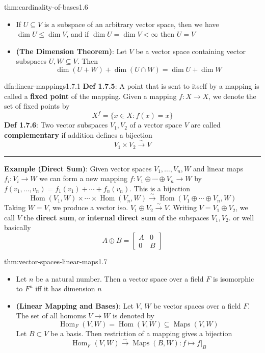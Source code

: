 \documentclass[landscape, 8pt]{extarticle}
\DeclareMathOperator{\Maps}{Maps}
\DeclareMathOperator{\Hom}{Hom}
\begin{document}
\begin{multicols}{3}
\begin{thm}{thm:cardinality-of-bases}{1.6}
\begin{itemize}
        \item[\textbf{1.6.9}] If $U \subseteq V$ is a subspace of an arbitrary vector space, then we have $\dim U \le \dim V$, and if $\dim U = \dim V < \infty$ then $U = V$
        \item[\textbf{1.6.10}] \textbf{(The Dimension Theorem)}: Let $V$ be a vector space containing vector subspaces $U,W\subseteq V$. Then
        \[\dim(U + W) + \dim(U \cap W) = \dim U + \dim W\]
    \end{itemize}
\end{thm}

\begin{dfn}{dfn:linear-mappings}{1.7.1}
    \textbf{Def 1.7.5}: A point that is sent to itself by a mapping is called a \textbf{fixed point} of the mapping. Given a mapping $f : X \to X$, we denote the set of fixed points by
    \[X^{f} = \{x \in X : f(x) = x\}\]
    \textbf{Def 1.7.6}: Two vector subspaces $V_{1}, V_{2}$ of a vector space $V$ are called \textbf{complementary} if addition defines a bijection
    \[V_{1} \times V_{2} \xrightarrow{\sim} V\]

    \vspace{-5pt}
    \noindent\rule{\textwidth}{0.2pt}

    \textbf{Example (Direct Sum)}: Given vector spaces $V_{1},\dots,V_{n}, W$ and linear maps $f_{i} : V_{i} \to W$ we can form a new mapping $f : V_{1} \oplus \cdots \oplus V_{n} \to W$ by $f(v_{1},\dots,v_{n}) = f_{1}(v_{1}) + \cdots + f_{n}(v_{n})$. This is a bijection
    \[\Hom(V_{1}, W) \times \cdots \times \Hom(V_{n}, W) \xrightarrow{\sim} \Hom(V_{1} \oplus \cdots \oplus V_{n}, W)\]
    Taking $W = V$, we produce a vector iso. $V_{1} \oplus V_{2} \xrightarrow{\sim} V$. Writing $V = V_{1} \oplus V_{2}$, we call $V$ the \textbf{direct sum}, or \textbf{internal direct sum} of the subspaces $V_{1}, V_{2}$. or well basically
    \[A \oplus B = \begin{bmatrix}
        A & 0 \\
        0 & B
    \end{bmatrix}\]

\end{dfn}

\begin{thm}{thm:vector-spaces-linear-maps}{1.7}
    \begin{itemize}
        \setlength\itemsep{0em}
        \item[\textbf{1.7.7}] Let $n$ be a natural number. Then a vector space over a field $F$ is isomorphic to $F^{n}$ iff it has dimension $n$
        \item[\textbf{1.7.8}] \textbf{(Linear Mapping and Bases)}: Let $V$, $W$ be vector spaces over a field $F$. The set of all homoms $V\to W$ is denoted by
        \[\Hom_{F}(V,W) = \Hom(V,W)\subseteq \Maps(V,W)\]
        Let $B \subset V$ be a basis. Then restriction of a mapping gives a bijection
            \[\Hom_{F}(V, W) \xrightarrow{\sim} \Maps(B, W) :
            f \mapsto f \lvert_{B}\]



\end{itemize}
\end{thm}
\end{multicols}
\end{document}
